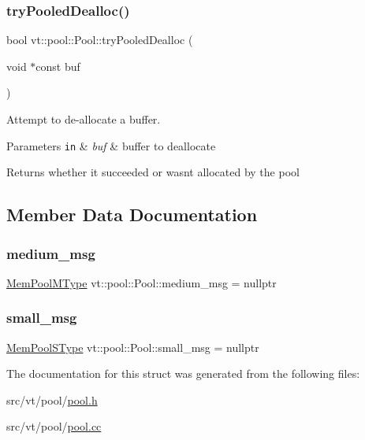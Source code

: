 \subsubsection{\texorpdfstring{try\+Pooled\+Dealloc()}{tryPooledDealloc()}}
{\footnotesize\ttfamily bool vt\+::pool\+::\+Pool\+::try\+Pooled\+Dealloc (\begin{DoxyParamCaption}\item[{void $\ast$const}]{buf }\end{DoxyParamCaption})\hspace{0.3cm}{\ttfamily [private]}}



Attempt to de-\/allocate a buffer. 


\begin{DoxyParams}[1]{Parameters}
\mbox{\tt in}  & {\em buf} & buffer to deallocate\\
\hline
\end{DoxyParams}
\begin{DoxyReturn}{Returns}
whether it succeeded or wasn\textquotesingle{}t allocated by the pool 
\end{DoxyReturn}


\subsection{Member Data Documentation}
\mbox{\label{structvt_1_1pool_1_1_pool_a268cb9b30cde3272c49e67e781f0345e}} 
\subsubsection{\texorpdfstring{medium\+\_\+msg}{medium\_msg}}
{\footnotesize\ttfamily \hyperlink{structvt_1_1pool_1_1_pool_a8a201b9a843e47cd4e7b568a8e4483da}{Mem\+Pool\+M\+Type} vt\+::pool\+::\+Pool\+::medium\+\_\+msg = nullptr\hspace{0.3cm}{\ttfamily [private]}}

\mbox{\label{structvt_1_1pool_1_1_pool_a8f14f2f9b344882cf727200eb8d41845}} 
\subsubsection{\texorpdfstring{small\+\_\+msg}{small\_msg}}
{\footnotesize\ttfamily \hyperlink{structvt_1_1pool_1_1_pool_a9f94985824d12c43357cfe50eaaefd38}{Mem\+Pool\+S\+Type} vt\+::pool\+::\+Pool\+::small\+\_\+msg = nullptr\hspace{0.3cm}{\ttfamily [private]}}



The documentation for this struct was generated from the following files\+:\begin{DoxyCompactItemize}
\item 
src/vt/pool/\hyperlink{pool_8h}{pool.\+h}\item 
src/vt/pool/\hyperlink{pool_8cc}{pool.\+cc}\end{DoxyCompactItemize}
